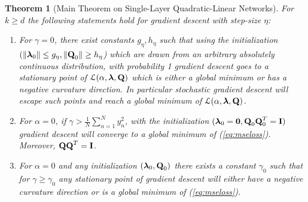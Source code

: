 \documentclass[11pt]{article}
\theoremstyle{plain}
\newtheorem{theorem}{Theorem}
\theoremstyle{plain}
\numberwithin{equation}{section}
\numberwithin{lemma}{section}
\numberwithin{theorem}{section}
\numberwithin{corollary}{section}
\numberwithin{observation}{section}
\numberwithin{definition}{section}
\numberwithin{example}{section}
\begin{document}
\begin{theorem} [Main Theorem on Single-Layer Quadratic-Linear Networks] \label{thm:main-alpha} For $k \geq d$ the following statements hold for gradient descent with step-size $\eta$: 
\begin{enumerate}
    \item For $\gamma = 0$, there exist constants $g_\eta, h_\eta$ such that using the initialization $(\|\V{\lambda}_0\| \leq g_{\eta},\|\Mx{Q}_0\| \geq h_{\eta}$) which are drawn from an arbitrary absolutely continuous distribution, with probability 1 gradient descent goes to a stationary point of $\mathcal{L}(\alpha,\V{\lambda},\Mx{Q})$ which is either a global minimum or has a negative curvature direction. In particular stochastic gradient descent will escape such points and reach a global minimum of $\mathcal{L}(\alpha,\V{\lambda},\Mx{Q})$.
    \item For $\alpha = 0$, if $\gamma > \frac{1}{N}\sum_{n=1}^N y_n^2$, with the initialization $(\V{\lambda}_0 = \V{0},\Mx{Q}_0\Mx{Q}_0^T = \Mx{I})$ gradient descent will converge to a global minimum of (\ref{eq:mseloss}). Moreover, $\Mx{Q}\Mx{Q}^T = \Mx{I}$.
    \item For $\alpha = 0$ and any initialization $(\V{\lambda}_0,\Mx{Q}_0)$ there exists a constant $\gamma_{0}$ such that for $\gamma \geq \gamma_0$ any stationary point of gradient descent will either have a negative curvature direction or is a global minimum of (\ref{eq:mseloss}). 
\end{enumerate}
\end{theorem}
\end{document}

